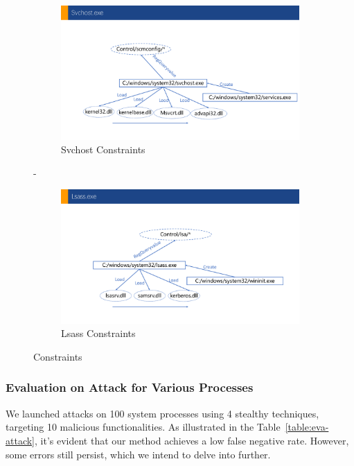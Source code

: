 \begin{figure}
\begin{minipage}[b]{0.34\textwidth}
  \begin{subfigure}{.99\textwidth}
      \includegraphics[width=\textwidth]{figs/svchost.pdf}
      \caption{Svchost Constraints}
      \label{fig:svc-cons}
  \end{subfigure}
  \hfill
  -\vspace{0.9cm}
  \begin{subfigure}{.99\textwidth}
      \includegraphics[width=\textwidth]{figs/lsass.pdf}
      \caption{Lsass Constraints}
      \label{fig:lsass-cons}
  \end{subfigure}
\caption{Constraints}
\label{fig-fdh}
\end{minipage}
\end{figure}

\subsubsection{Evaluation on Attack for Various Processes}
We launched attacks on 100 system processes using 4 stealthy techniques, targeting 10 malicious functionalities. As illustrated in the Table~\ref{table:eva-attack}, it's evident that our method achieves a low false negative rate. However, some errors still persist, which we intend to delve into further.

